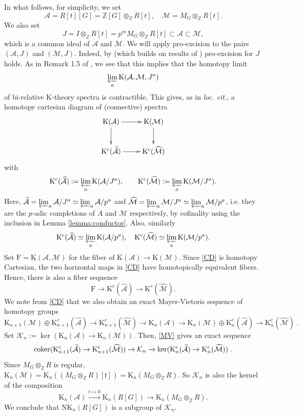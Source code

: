 \documentclass[reqno,11pt,letterpaper]{amsart}
\theoremstyle{plain}
\numberwithin{equation}{subsection}
\theoremstyle{remark}
\theoremstyle{plain}
\theoremstyle{definition}\newtheorem*{notation}{Notation}
\newcommand{\A}{{\mathcal A}}
\newcommand{\M}{{\mathcal M}}
\newcommand{\K}{{\mathcal K}}
\newcommand{\RK}{\mathrm{K}}
\newcommand{\RF}{\mathrm{F}}
\newcommand{\RNK}{\mathrm{NK}}
\newcommand{\BZ}{\mathbb{Z}}
\newcommand{\prolim}{\varprojlim}
\newcommand{\wh}{\widehat}
\begin{document}
In what follows, for simplicity, we set
\[
\A=R[t][G]=\BZ[G]\otimes_\BZ R[t], \quad \M= M_G\otimes_\BZ R[t]. 
\]
We also set 
\[
J=I\otimes_\BZ R[t]=p^m M_G\otimes_\BZ R[t]\subset \A\subset \M,
\]
which is a common ideal of $\A$ and $\M$.
 We will apply pro-excision to the pairs $(\A, J)$ and $(\M, J)$.
 Indeed, by \cite[Thm. 0.2, Thm. 0.3, Cor. 0.4]{Morrowpro2} (which builds on results of \cite{GHbi}) 
 pro-excision for $J$ holds. As in Remark 1.5 of \cite{Morrowpro}, we see that
 this implies that the homotopy limit
 \[
 \prolim_a \RK(\A, \M, J^a)
 \]
 of bi-relative $\RK$-theory spectra is contractible. This gives, as in \emph{loc. cit.},  
a
homotopy cartesian diagram of (connective) spectra 
 \begin{equation}\label{CD}
\begin{aligned}
\xymatrix{
\RK(\A) \ar[r]\ar[d] & \RK(\M) \ar[d]\\
\RK^c(\wh \A)\ar[r] &\RK^c(\wh \M)\\
}
\end{aligned}
\end{equation}
with
\[
\RK^c(\wh \A):=\prolim_a \RK( \A/J^a),\qquad  \RK^c(\wh \M):=\prolim_a \RK(\M/J^a).
\]
Here, $\wh \A=\prolim_a \A/J^a\simeq \prolim_a \A/p^a$ and $\wh \M=\prolim_a \M/J^a\simeq \prolim_a \M/p^a$,
i.e. they are the $p$-adic completions of $A$ and $\M$ respectively, by cofinality using the inclusion
 in   Lemma \ref{lemma:conductor}.
Also, similarly
\[
\RK^c(\wh \A) \simeq \prolim_a \RK( \A/p^a), \quad
 \RK^c(\wh \M) \simeq \prolim_a \RK(\M/p^a).
\]
Set $\RF=\RK(\A, \M)$ for the fiber of $\RK(\A)\to \RK(\M)$. Since \eqref{CD} is homotopy Cartesian, 
the two horizontal maps in \eqref{CD} have homotopically equivalent fibers. Hence, there is also a fiber sequence  
\begin{equation}\label{fib1}
\RF\to \RK^c(\wh \A)\to \RK^c(\wh \M).
\end{equation}
We note from \eqref{CD} that we also obtain an exact Mayer-Vietoris sequence of homotopy groups
\begin{equation}\label{MV}
 \RK_{n+1}(\M)\oplus \RK^c_{n+1}(\wh \A)\to \RK^c_{n+1}(\wh \M)\to \RK_n(\A) \to \RK_{n}(\M)\oplus \RK^c_{n}(\wh \A)\to \RK^c_{n}(\wh \M)\ .
\end{equation}
Set
$
\K_n:=\ker( \RK_n(\A) \to \RK_{n}(\M)).
$
Then, \eqref{MV} gives  an exact sequence
\begin{equation}\label{MV2}
{\rm {coker}}(\RK^c_{n+1}(\wh \A)\to \RK^c_{n+1}(\wh \M))\to \K_n\to \ker(\RK^c_{n}(\wh \A)\to \RK^c_{n}(\wh \M))\ .
\end{equation}
Since $ M_G\otimes_\BZ R$ is regular,
$
\RK_n(\M)=\RK_n(( M_G\otimes_\BZ R)[t])=\RK_n( M_G\otimes_\BZ R).
$
So $\K_n$ is also the kernel of the composition
\[
\RK_n(\A)\xrightarrow{t\mapsto 0}  \RK_n(R[G])\to \RK_n(M_G\otimes_\BZ R).
\]
We conclude that
$\RNK_n(R[G])$ is a subgroup of $\K_n$.
\end{document}
